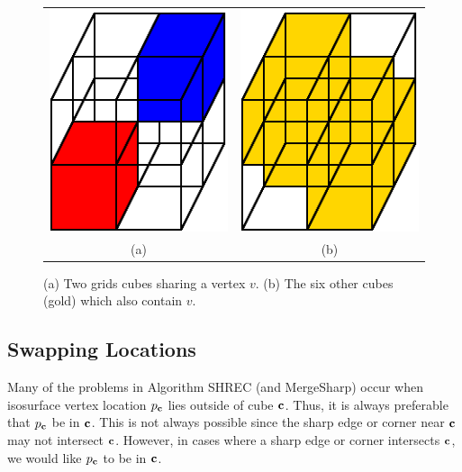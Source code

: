 \begin{figure}[t]
\centering

\begin{tabular}{cc}
\includegraphics[width=0.4\linewidth]{images/shared_vertex.eps} \qquad &
\qquad
\includegraphics[width=0.4\linewidth]{images/shared_vertex_B.eps} \\
(a) & (b)
\end{tabular}

\caption{(a) Two grids cubes sharing a vertex $v$.
(b) The six other cubes (gold) which also contain $v$.
}
\label{fig:shared_vertex}
\end{figure}

\subsection{Swapping Locations}

Many of the problems in Algorithm SHREC (and MergeSharp) occur when
isosurface vertex location $p_{\mathbf{c}}$ lies outside of cube $\mathbf{c}$.
Thus, it is always preferable that $p_{\mathbf{c}}$ be in $\mathbf{c}$.
This is not always possible since the sharp edge or corner near $\mathbf{c}$
may not intersect $\mathbf{c}$.
However, in cases where a sharp edge or corner intersects $\mathbf{c}$,
we would like $p_{\mathbf{c}}$ to be in $\mathbf{c}$.


